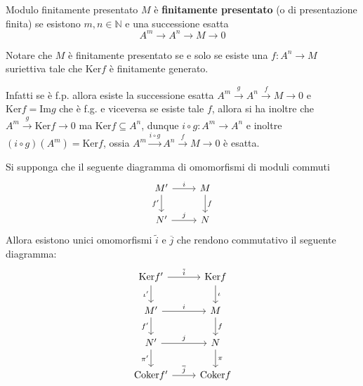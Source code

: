 \begin{definition}{Modulo finitamente presentato}
    \(M\) è \textbf{finitamente presentato} (o di presentazione finita) se
    esistono \(m , n \in \mathbb{N}\) e una successione esatta
    \[
      A^{m} \to A^{n} \to M \to 0
    \]
\end{definition}

\begin{remark}{}
    Notare che \(M\) è finitamente presentato se e solo se esiste una \(f :
    A^{n} \to M\) suriettiva tale che \(\mathrm{Ker} f\) è finitamente
    generato.

    Infatti se è f.p. allora esiste la successione esatta \(A^{m}
    \overset{g}{\to}  A^{n} \overset{f}{\to} M \to 0\) e \(\mathrm{Ker}f =
    \mathrm{Im}g\) che è f.g. e viceversa se esiste tale \(f\), allora
    si ha inoltre che \(A^{m} \overset{g}{\to}  \mathrm{Ker}f \to 0\) ma \(\mathrm{Ker}f
    \subseteq A^{n} \), dunque \(i \circ g : A^{m} \to A^{n}\) e inoltre \({(i \circ
    g)}{(A^{m})} = \mathrm{Ker}f\), ossia \(A^{m} \overset{i \circ g}{\to} A^{n}
    \overset{f}{\to} M \to 0\) è esatta.
\end{remark}


\begin{proposition}
    Si supponga che il seguente diagramma di omomorfismi di moduli commuti
    \[
      \begin{tikzcd} M' \arrow[r,"i"] \arrow[d,"f'"'] & M \arrow[d,"f"]\\ N'
      \arrow[r,"j"] & N \end{tikzcd}
    \]
    Allora esistono unici omomorfismi \(\tilde{i}\) e \(\overline{j}\) che rendono
    commutativo il seguente diagramma:
    \[
      \begin{tikzcd}
          \mathrm{Ker}f' \arrow[r, "\tilde{i}"] \arrow[d, "\iota'"'] & \mathrm{Ker}f
          \arrow[d, "\iota"]\\
          M' \arrow[r,"i"] \arrow[d,"f'"'] & M \arrow[d,"f"]\\
          N' \arrow[r,"j"] \arrow[d, "\pi'"'] & N \arrow[d, "\pi"]\\
          \mathrm{Coker}f' \arrow[r, "\overline{j}"] & \mathrm{Coker}f
      \end{tikzcd}
    \]
\end{proposition}

